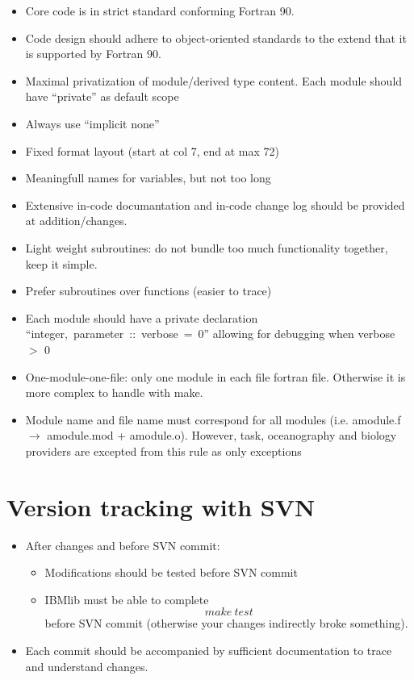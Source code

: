 \begin{itemize}
  \item Core code is in strict standard conforming Fortran 90.
  \item Code design should adhere to object-oriented standards
        to the extend that it is supported by Fortran 90.
  \item Maximal privatization of module/derived type content.
        Each module should have ``private'' as default scope 
  \item Always use ``implicit none''
  \item Fixed format layout (start at col 7, end at max 72)
  \item Meaningfull names for variables, but not too long
  \item Extensive in-code documantation and in-code change log
        should be provided at addition/changes.
  \item Light weight subroutines: do not bundle too much functionality
        together, keep it simple. 
  \item Prefer subroutines over functions (easier to trace) 
  \item Each module should have a private declaration 
        \hbox{``integer, parameter :: verbose = 0''}
        allowing for debugging when verbose $>$ 0
  \item One-module-one-file: only one module in each file fortran file.
        Otherwise it is more complex to handle with make.
  \item Module name and file name must correspond for all
        modules (i.e. amodule.f $\rightarrow$ amodule.mod + amodule.o).
        However, task, oceanography and biology providers are 
        excepted from this rule as only exceptions
\end{itemize}

\section{Version tracking with SVN}
\begin{itemize}
  \item After changes and before SVN commit:
        \begin{itemize}
           \item Modifications should be tested before SVN commit
           \item IBMlib must be able to complete
                 \[ make \ test
                 \]  
                 before SVN commit (otherwise your changes indirectly broke something).
        \end{itemize}
  \item Each commit should be accompanied by sufficient 
        documentation to trace and understand changes.
   
\end{itemize}


